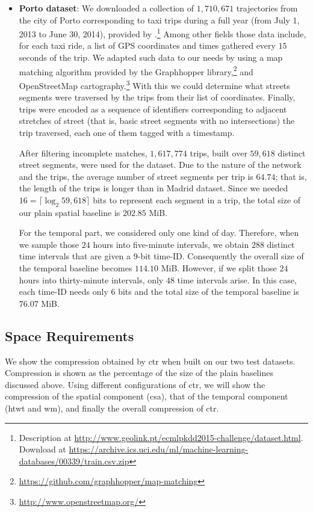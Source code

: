 \begin{itemize}
	\item \textbf{Porto dataset}:
		We downloaded a collection of $1,\!710,\!671 $ trajectories from the city of {Porto} corresponding to taxi trips during 
		a full year (from July 1, 2013 to June 30, 2014), provided by \cite{moreira2013predicting}.\footnote{Description at \url{http://www.geolink.pt/ecmlpkdd2015-challenge/dataset.html}. Download at \url{https://archive.ics.uci.edu/ml/machine-learning-databases/00339/train.csv.zip}} Among other
		fields those data include, for each taxi ride, a list of GPS coordinates and times gathered every $15$ seconds of
		the trip. We adapted such data to our needs by using a map matching algorithm provided by the Graphhopper library,\footnote{\url{https://github.com/graphhopper/map-matching}}
		 and OpenStreetMap cartography.\footnote{\url{http://www.openstreetmap.org/}} With this we could determine what streets segments were traversed by the trips from their list of coordinates. Finally, trips were encoded as a sequence of identifiers
	  corresponding to adjacent stretches of street (that is, basic street segments with no intersections) the trip traversed, each one of them tagged with a timestamp.
	  
	  After filtering incomplete matches, $1,\!617,\!774$ trips, built  over $59,\!618$ distinct street segments, were used for the dataset. 
	  Due to the nature of the network and the trips, 
	  the average number of street segments per trip is $64.74$; that is, the length of the trips is longer than in Madrid dataset.
	  Since we needed $16=\lceil\log_2 59,\!618 \rceil$ bits to represent each segment in a trip, the total size of our plain spatial baseline is $202.85$ MiB.

	  For the temporal part, we considered only one kind of day. Therefore, when we sample those $24$ hours into five-minute intervals,
	  we obtain $288$ distinct time intervals that are given a $9$-bit time-ID. Consequently the overall size of the temporal
	  baseline becomes $114.10$ MiB. However, if we split those $24$ hours into thirty-minute intervals, only $48$ time intervals 
	  arise. In this case, each time-ID needs only $6$ bits and the total size of the temporal baseline is $76.07$ MiB.
	\end{itemize}


	\subsection{Space Requirements}
	\label{sec:ctr:exp:space}
	We show the compression obtained by \gls{ctr} when built on our two test datasets. Compression is shown as the percentage of the size of the plain baselines discussed above.
	Using different configurations of \gls{ctr}, we will show the compression of the spatial component (\gls{csa}), 
	that of the temporal component (\gls{htwt} and \gls{wm}), and finally the overall compression of \gls{ctr}.

